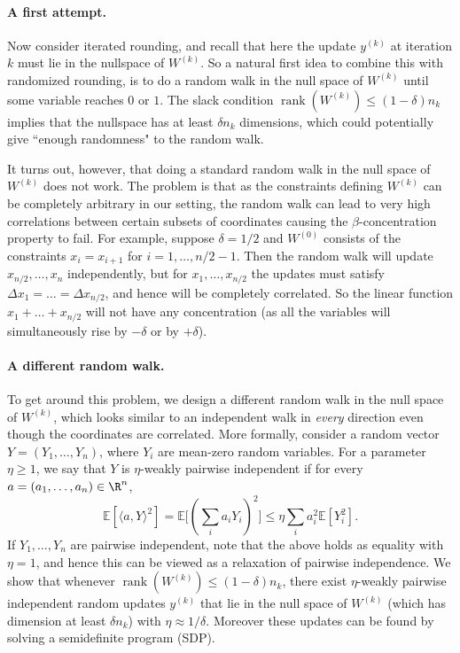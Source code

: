 \documentclass{toc}
\newcommand{\rank}{\operatorname{rank}}
\newcommand{\ip}[1]{\langle #1 \rangle}
\newcommand{\E}{\mathbb{E}}
\begin{document}
\paragraph{A first attempt.} Now consider iterated rounding, and recall that here the update $y^{(k)}$ at iteration $k$ must lie in the nullspace of $W^{(k)}$. So a natural first idea to combine this with randomized rounding, is to do a random walk in the null space of $W^{(k)}$ until some variable reaches $0$ or $1$. The slack condition $\rank(W^{(k)}) \leq (1-\delta) n_k$ implies that the nullspace has at least $\delta n_k$ dimensions, which could potentially give ``enough randomness" to the random walk.

It turns out, however,  %
 that doing a standard random walk in the null space of $W^{(k)}$ does not work. The problem is that as the constraints defining $W^{(k)}$
can be completely arbitrary in our setting, the random walk can lead to very high correlations between certain subsets of coordinates causing the $\beta$-concentration property to fail. For example, suppose $\delta=1/2$ and $W^{(0)}$ consists of the constraints $x_i=x_{i+1}$ for $i=1,\ldots,n/2-1$. Then the random walk will update $x_{n/2},\ldots,x_n$ independently, but for $x_1,\ldots,x_{n/2}$ the updates must satisfy $\Delta x_1 = \ldots = \Delta x_{n/2}$, and hence will be completely correlated. So the linear function $x_1 + \ldots + x_{n/2}$ will not have any concentration (as all the  variables will simultaneously rise by $-\delta$ or by $+\delta$).

\paragraph{A different random walk.} To get around this problem, we design a different random walk in the null space of $W^{(k)}$, which looks similar to an independent walk  in \emph{every} direction even though the coordinates are correlated.
More formally, consider a random vector $Y=(Y_1,\ldots,Y_n)$, where $Y_i$ are mean-zero random variables. For a parameter $\eta \geq 1$, we say
that $Y$ is $\eta$-weakly pairwise independent
if for every $a=(a_1,\ldots,a_n) \in \R^n$,
 \[ \E[ \ip{ a, Y}^2  ]  =  \E \Big[(\sum_i a_i Y_i)^2 \Big]\leq  \eta  \sum_i a_i^2 \E[Y_i^2]. \]
If $Y_1,\ldots,Y_n$ are pairwise independent, note that the above holds as equality  with $\eta=1$, and hence  this can be viewed as a relaxation of pairwise independence.
We show that whenever $\rank(W^{(k)}) \leq (1-\delta) n_k$, there exist $\eta$-weakly pairwise independent random updates $y^{(k)}$ that lie in the null space of $W^{(k)}$ (which has dimension at least $\delta n_k$) with $\eta \approx 1/\delta$.
%
%
Moreover these updates can be found by solving a semidefinite program (SDP).
\end{document}
